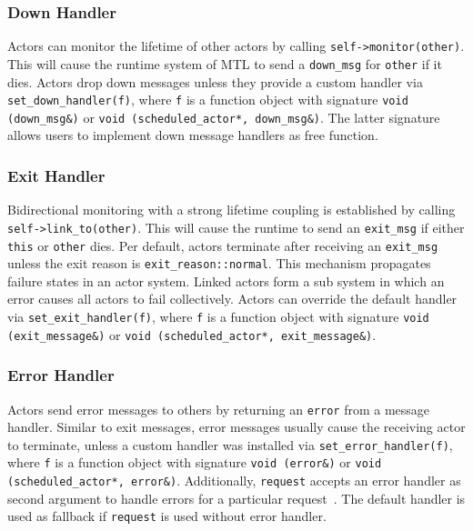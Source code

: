 \subsubsection{Down  Handler}
\label{down-message}

Actors can monitor the lifetime of other actors by calling \lstinline^self->monitor(other)^. This will cause the runtime system of MTL to send a \lstinline^down_msg^ for \lstinline^other^ if it dies. Actors drop down messages unless they provide a custom handler via \lstinline^set_down_handler(f)^, where \lstinline^f^ is a function object with signature \lstinline^void (down_msg&)^ or \lstinline^void (scheduled_actor*, down_msg&)^. The latter signature allows users to implement down message handlers as free function.

\subsubsection{Exit Handler}
\label{exit-message}

Bidirectional monitoring with a strong lifetime coupling is established by calling \lstinline^self->link_to(other)^. This will cause the runtime to send an \lstinline^exit_msg^ if either \lstinline^this^ or \lstinline^other^ dies. Per default, actors terminate after receiving an \lstinline^exit_msg^ unless the exit reason is \lstinline^exit_reason::normal^. This mechanism propagates failure states in an actor system. Linked actors form a sub system in which an error causes all actors to fail collectively. Actors can override the default handler via \lstinline^set_exit_handler(f)^, where \lstinline^f^ is a function object with signature \lstinline^void (exit_message&)^ or \lstinline^void (scheduled_actor*, exit_message&)^.

\subsubsection{Error Handler}
\label{error-message}

Actors send error messages to others by returning an \lstinline^error^  from a message handler. Similar to exit messages, error messages usually cause the receiving actor to terminate, unless a custom handler was installed via \lstinline^set_error_handler(f)^, where \lstinline^f^ is a function object with signature \lstinline^void (error&)^ or \lstinline^void (scheduled_actor*, error&)^. Additionally, \lstinline^request^ accepts an error handler as second argument to handle errors for a particular request~. The default handler is used as fallback if \lstinline^request^ is used without error handler.

